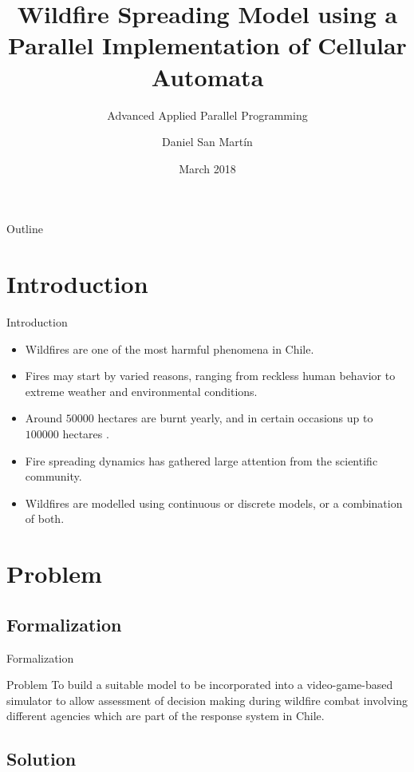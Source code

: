 \documentclass{beamer}
\title{Wildfire Spreading Model using a Parallel Implementation of Cellular Automata}
\subtitle{Advanced Applied Parallel Programming}
\author{Daniel San Martín}
\institute{Departamento de Informática \\ Universidad Técnica Federico Santa María}
\date{March 2018}
\begin{document}
 
  \frame{\titlepage}

  \begin{frame}{Outline}
    \tableofcontents
  \end{frame}

  \section{Introduction}

      \begin{frame}{Introduction}
        \begin{itemize}
          \item<1-> Wildfires are one of the most harmful phenomena in Chile.
          \item<2-> Fires may start by varied reasons, ranging from reckless human behavior to extreme weather 
              and environmental conditions.
          \item<3-> Around $50000$ hectares are burnt yearly, and in certain occasions up to $100000$ 
              hectares \cite{fireCONAF}.
          \item<4-> Fire spreading dynamics has gathered large attention from the scientific community.
          \item<5-> Wildfires are modelled using continuous or discrete models, or a combination of both.
        \end{itemize}
      \end{frame}

   
  \section{Problem}    
    \subsection{Formalization}
      
      \begin{frame}{Formalization}
        \begin{block}{Problem}
          To build a suitable model to be incorporated into a video-game-based 
          simulator to allow assessment of decision making during wildfire combat 
          involving different agencies which are part of the response system in Chile.
        \end{block}
      \end{frame}
      
      
    \subsection{Solution}
\end{document}
